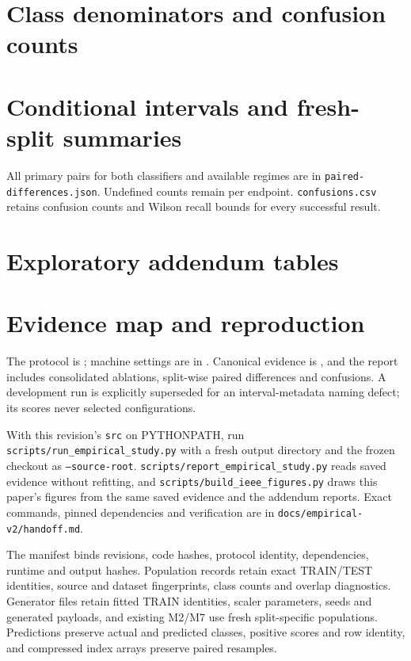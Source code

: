 \section{Class denominators and confusion counts}


\section{Conditional intervals and fresh-split summaries}



All primary pairs for both classifiers and available regimes are in \texttt{paired-differences.json}. Undefined counts remain per endpoint. \texttt{confusions.csv} retains confusion counts and Wilson recall bounds for every successful result.

\section{Exploratory addendum tables}






\section{Evidence map and reproduction}
The protocol is ; machine settings are in . Canonical evidence is , and the report includes consolidated ablations, split-wise paired differences and confusions. A development run is explicitly superseded for an interval-metadata naming defect; its scores never selected configurations.

With this revision's \texttt{src} on PYTHONPATH, run \texttt{scripts/run\_empirical\_study.py} with a fresh output directory and the frozen checkout as \texttt{--source-root}. \texttt{scripts/report\_empirical\_study.py} reads saved evidence without refitting, and \texttt{scripts/build\_ieee\_figures.py} draws this paper's figures from the same saved evidence and the addendum reports. Exact commands, pinned dependencies and verification are in \texttt{docs/empirical-v2/handoff.md}.

The manifest binds revisions, code hashes, protocol identity, dependencies, runtime and output hashes. Population records retain exact TRAIN/TEST identities, source and dataset fingerprints, class counts and overlap diagnostics. Generator files retain fitted TRAIN identities, scaler parameters, seeds and generated payloads, and existing M2/M7 use fresh split-specific populations. Predictions preserve actual and predicted classes, positive scores and row identity, and compressed index arrays preserve paired resamples.

